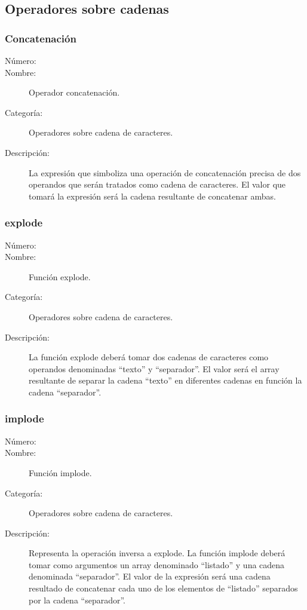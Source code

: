 \subsection{Operadores sobre cadenas}

\subsubsection{Concatenación}
\begin{framed}
	\begin{description}
		\item [Número:] \cn
		\item [Nombre:] Operador concatenación.
		\item [Categoría:] Operadores sobre cadena de caracteres.
		\item [Descripción:] La expresión que simboliza una operación de concatenación precisa de dos operandos que serán
		tratados como cadena de caracteres. El valor que tomará la expresión será la cadena resultante de concatenar ambas.
	\end {description}
\end{framed}

\subsubsection{explode}
\begin{framed}
	\begin{description}
		\item [Número:] \cn
		\item [Nombre:] Función explode.
		\item [Categoría:] Operadores sobre cadena de caracteres.
		\item [Descripción:] La función explode deberá tomar dos cadenas de caracteres como operandos denominadas ``texto'' y ``separador''.
		El valor será el array resultante de separar la cadena ``texto'' en diferentes cadenas en función la cadena ``separador''.
	\end {description}
\end{framed}

\subsubsection{implode}
\begin{framed}
	\begin{description}
		\item [Número:] \cn
		\item [Nombre:] Función implode.
		\item [Categoría:] Operadores sobre cadena de caracteres.
		\item [Descripción:] Representa la operación inversa a explode. La función implode deberá tomar como argumentos un array denominado
		``listado'' y una cadena denominada ``separador''. El valor de la expresión será una cadena resultado de concatenar cada uno
		de los elementos de ``listado'' separados por la cadena ``separador''.
	\end {description}
\end{framed}

